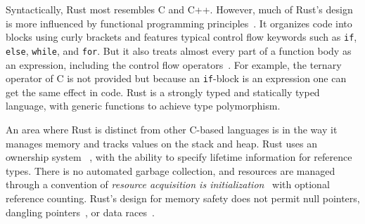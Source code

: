 Syntactically, Rust most resembles C and C++. However, much of Rust's design is more influenced by functional programming principles~\cite[Chapter~13]{rpl.2019}. It organizes code into blocks using curly brackets and features typical control flow keywords such as \texttt{if}, \texttt{else}, \texttt{while}, and \texttt{for}. But it also treats almost every part of a function body as an expression, including the control flow operators~\cite[Chapter~6]{programming.rust.2021}. For example, the ternary operator of C is not provided but because an \texttt{if}-block is an expression one can get the same effect in code. Rust is a strongly typed and statically typed language, with generic functions to achieve type polymorphism.

An area where Rust is distinct from other C-based languages is in the way it manages memory and tracks values on the stack and heap. Rust uses an ownership system~\cite[Chapter~4]{programming.rust.2021} , with the ability to specify lifetime information for reference types. There is no automated garbage collection, and resources are managed through a convention of \textit{resource acquisition is initialization}~\cite{cpp.design.evolution.1994} with optional reference counting. Rust's design for memory safety does not permit null pointers, dangling pointers~\cite{taste.of.rust.2013}, or data races~\cite[Chapter~8.1]{rustonomicon}.
